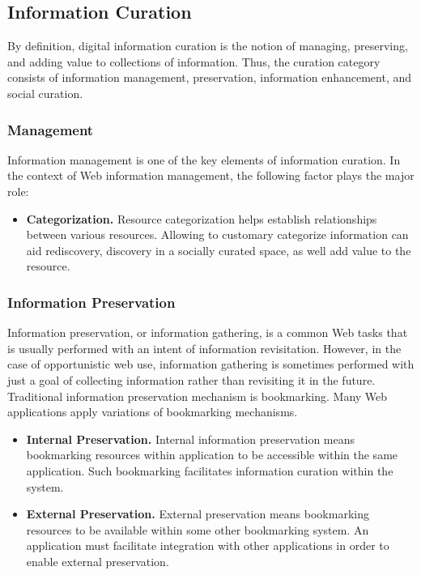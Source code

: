 \documentclass{casconpaper}
\begin{document}
{\subsection{Information Curation}
By definition, digital information curation is the notion of managing, preserving, and adding value to collections of information. Thus, the curation category consists of information management, preservation, information enhancement, and social curation.  
} %

{\subsubsection{Management}
Information management is one of the key elements of information curation. In the context of Web information management, the following factor plays the major role:
\begin{itemize}
  \item \textbf{Categorization.} Resource categorization helps establish relationships between various resources. Allowing to customary categorize information can aid rediscovery, discovery in a socially curated space, as well add value to the resource.
\end{itemize}
} %

{\subsubsection{Information Preservation}
Information preservation, or information gathering, is a common Web tasks that is usually performed with an intent of information revisitation. However, in the case of opportunistic web use, information gathering is sometimes performed with just a goal of collecting information rather than revisiting it in the future. Traditional information preservation mechanism is bookmarking. Many Web applications apply variations  of bookmarking mechanisms. 
\begin{itemize}
  \item \textbf{Internal Preservation.} Internal information preservation means bookmarking resources within application to be accessible within the same application. Such bookmarking facilitates information curation within the system.
  
  \item \textbf{External Preservation.} External preservation means bookmarking resources to be available within some other bookmarking system. An application must facilitate integration with other applications in order to enable external preservation.
\end{itemize}
} %
\end{document}
